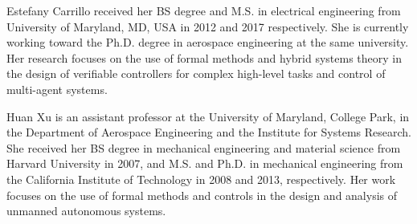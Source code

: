 \documentclass{ieeeaccess}
\begin{document}
\begin{IEEEbiography}{Estefany Carrillo} 
 received her BS degree and M.S. in electrical engineering from University of Maryland, MD, USA in 2012 and 2017 respectively. She is currently working toward the Ph.D. degree in aerospace engineering at the same university. Her research focuses on the use of formal methods and hybrid systems theory in the design of verifiable controllers for complex high-level tasks and control of multi-agent systems. 
\end{IEEEbiography}

\begin{IEEEbiography}{Huan Xu} 
 is an assistant professor at the University of Maryland, College Park, in the Department of Aerospace Engineering and the Institute for Systems Research. She received her BS degree in mechanical engineering and material science from Harvard University in 2007, and M.S. and Ph.D. in mechanical engineering from the California Institute of Technology in 2008 and 2013, respectively. Her work focuses on the use of formal methods and controls in the design and analysis of unmanned autonomous systems.
\end{IEEEbiography}

\EOD
\end{document}
